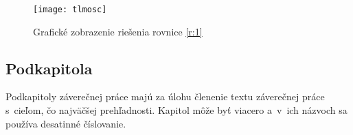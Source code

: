 \begin{figure}[ht!]
\centering
\texttt{[image: tlmosc]}
\caption{Grafické zobrazenie riešenia rovnice \eqref{r:1}}\label{o:2}
\end{figure}



\subsection{Podkapitola}
Podkapitoly záverečnej práce majú za úlohu členenie textu záverečnej
práce s~cieľom, čo najväčšej prehľadnosti. Kapitol môže byť viacero
a~v~ich názvoch sa používa desatinné číslovanie.